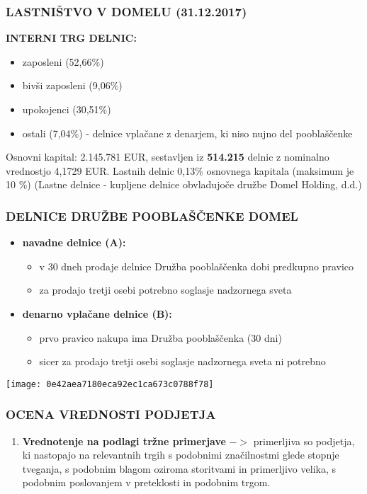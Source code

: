 \documentclass{beamer}
\begin{document}
\begin{frame}
\frametitle{LASTNIŠTVO V DOMELU (31.12.2017)}
\textbf{INTERNI TRG DELNIC:}
\begin{itemize}
\item zaposleni (52,66$\%$)
\item bivši zaposleni (9,06$\%$)
\item upokojenci (30,51$\%$)
\item ostali (7,04$\%$) - delnice vplačane z denarjem, ki niso nujno del pooblaščenke
\end{itemize}
Osnovni kapital: 2.145.781 EUR, sestavljen iz \textbf{514.215} delnic z nominalno vrednostjo 4,1729 EUR. 
Lastnih delnic 0,13\% osnovnega kapitala (maksimum je 10 \%)
(Lastne delnice - kupljene delnice obvladujoče družbe Domel Holding, d.d.)
\end{frame}


\begin{frame}
\frametitle{DELNICE DRUŽBE POOBLAŠČENKE DOMEL}
\begin{itemize}
\item \textbf{navadne delnice (A):}
\begin{itemize}
\item v 30 dneh prodaje delnice Družba pooblaščenka dobi predkupno pravico
\item za prodajo tretji osebi potrebno soglasje nadzornega sveta
\end{itemize}
\item \textbf{denarno vplačane delnice (B):}
\begin{itemize}
\item prvo pravico nakupa ima Družba pooblaščenka (30 dni)
\item sicer za prodajo tretji osebi soglasje nadzornega sveta ni potrebno
\end{itemize}
\end{itemize}
\end{frame}


\begin{frame}
\begin{center}
\texttt{[image: 0e42aea7180eca92ec1ca673c0788f78]}
\end{center}
\end{frame}


\begin{frame}
\frametitle{OCENA VREDNOSTI PODJETJA}
\begin{enumerate}
\item \textbf{Vrednotenje na podlagi tržne primerjave} $->$ primerljiva so podjetja, ki nastopajo na relevantnih trgih s podobnimi značilnostmi glede stopnje tveganja, s podobnim blagom oziroma storitvami in primerljivo velika, s podobnim poslovanjem v preteklosti in podobnim trgom. %
\end{enumerate}
\end{frame}
\end{document}
